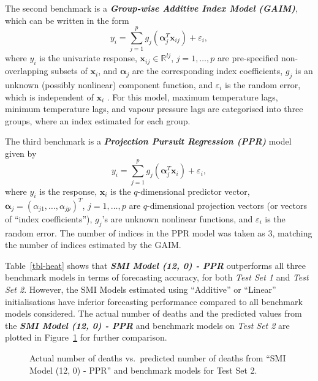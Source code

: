 \documentclass[
  11pt,
  a4paper,
]{article}
\begin{document}
The second benchmark is a \textbf{\emph{Group-wise Additive Index Model
(GAIM)}}, which can be written in the form \[
  y_{i} = \sum_{j = 1}^{p} g_{j}(\bm{\alpha}_{j}^{T}\bm{x}_{ij}) + \varepsilon_{i}, 
\] where \(y_{i}\) is the univariate response,
\(\bm{x}_{ij} \in \mathbb{R}^{l{j}}\), \(j = 1, \dots, p\) are
pre-specified non-overlapping subsets of \(\bm{x}_{i}\), and
\(\bm{\alpha}_j\) are the corresponding index coefficients, \(g_{j}\) is
an unknown (possibly nonlinear) component function, and
\(\varepsilon_{i}\) is the random error, which is independent of
\(\bm{x}_{i}\) \autocite{Wang2015-mp,Masselot2022}. For this model,
maximum temperature lags, minimum temperature lags, and vapour pressure
lags are categorised into three groups, where an index estimated for
each group.

The third benchmark is a \textbf{\emph{Projection Pursuit Regression
(PPR)}} model \autocite{Friedman1981} given by \[
  y_{i} = \sum_{j=1}^{p} {g_{j}(\bm{\alpha}_{j}^{T}\bm{x}_{i})} + \varepsilon_{i},
\] where \(y_{i}\) is the response, \(\bm{x}_{i}\) is the
\(q\)-dimensional predictor vector,
\(\bm{\alpha}_{j} = ( \alpha_{j1}, \dots, \alpha_{jp} )^{T}\),
\(j = 1, \dots, p\) are \(q\)-dimensional projection vectors (or vectors
of ``index coefficients''), \(g_{j}\)'s are unknown nonlinear functions,
and \(\varepsilon_{i}\) is the random error. The number of indices in
the PPR model was taken as 3, matching the number of indices estimated
by the GAIM.

Table~\ref{tbl-heat} shows that \textbf{\emph{SMI Model (12, 0) - PPR}}
outperforms all three benchmark models in terms of forecasting accuracy,
for both \emph{Test Set 1} and \emph{Test Set 2}. However, the SMI
Models estimated using ``Additive'' or ``Linear'' initialisations have
inferior forecasting performance compared to all benchmark models
considered. The actual number of deaths and the predicted values from
the \textbf{\emph{SMI Model (12, 0) - PPR}} and benchmark models on
\emph{Test Set 2} are plotted in Figure~\ref{fig-heatPred} for further
comparison.

\begin{figure}


\caption{\label{fig-heatPred}Actual number of deaths vs.~predicted
number of deaths from ``SMI Model (12, 0) - PPR'' and benchmark models
for Test Set 2.}

\end{figure}%
\end{document}
